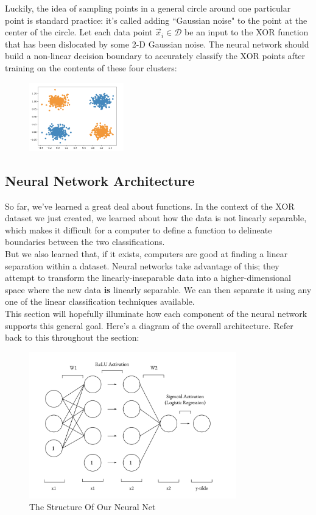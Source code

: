 \documentclass{article}
\begin{document}
Luckily, the idea of sampling points in a general circle around one particular point is standard practice: it's called adding ``Gaussian noise" to the point at the center of the circle. Let each data point $\vec{x}_i \in \mathcal{D}$ be an input to the XOR function that has been dislocated by some 2-D Gaussian noise. The neural network should build a non-linear decision boundary to accurately classify the XOR points after training on the contents of these four clusters:

\begin{figure}[htp]
    \centering
    \includegraphics[width=4.1cm]{dataset}
\end{figure}

\newpage

\subsection{Neural Network Architecture}
So far, we've learned a great deal about functions. In the context of the XOR dataset we just created, we learned about how the data is not linearly separable, which makes it difficult for a computer to define a function to delineate boundaries between the two classifications. \\

But we also learned that, if it exists, computers are good at finding a linear separation within a dataset. Neural networks take advantage of this; they attempt to transform the linearly-inseparable data into a higher-dimensional space where the new data \textbf{is} linearly separable. We can then separate it using any one of the linear classification techniques available. \\

This section will hopefully illuminate how each component of the neural network supports this general goal. Here's a diagram of the overall architecture. Refer back to this throughout the section:

\begin{figure}[htp]
    \centering
    \includegraphics[width=9cm]{nn_diagram.png}
    \caption{The Structure Of Our Neural Net}
\end{figure}
\end{document}
